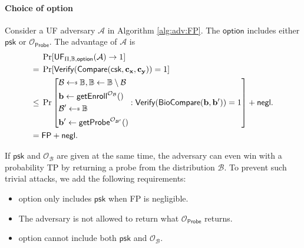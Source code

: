 \paragraph{Choice of \textsf{option}}
\noindent Consider a \textsf{UF} adversary $\mathcal{A}$ in Algorithm \ref{alg:adv:FP}. The $\textsf{option}$ includes either $\textsf{psk}$ or $\mathcal{O}_{\textsf{Probe}}$. The advantage of $\mathcal{A}$ is
\begin{align*}
	& \Pr[\textsf{UF}_{\Pi, \mathbb{B}, \textsf{option}}(\mathcal{A}) \to 1] \\ 
	=\; & \Pr [ \textsf{Verify}(\textsf{Compare}(\textsf{csk}, \mathbf{c_x}, \mathbf{c_y})) = 1 ] \\
	\leq\; & \Pr \left [
		\begin{aligned}
			& \mathcal{B} \getsdollar \mathbb{B}, \mathbb{B} \gets \mathbb{B} \setminus \mathcal{B} \\
			& \mathbf{b} \gets \textsf{getEnroll}^{\mathcal{O}_{\mathcal{B}} }() \\
			& \mathcal{B}^\prime \getsdollar \mathbb{B} \\
			& \mathbf{b}^\prime \gets \textsf{getProbe}^{\mathcal{O}_{\mathcal{B}^\prime} }()
		\end{aligned}
		: \textsf{Verify}(\textsf{BioCompare}(\mathbf{b}, \mathbf{b}^\prime)) = 1 \right ] + \negl. \\
	=\; & \textsf{FP} + \negl.
\end{align*}

\noindent If $\textsf{psk}$ and $\mathcal{O}_{\mathcal{B}}$ are given at the same time, the adversary can even win with a probability \textsf{TP} by returning a probe from the distribution $\mathcal{B}$. To prevent such trivial attacks, we add the following requirements:

\begin{itemize}
	\item \textsf{option} only includes $\textsf{psk}$ when \textsf{FP} is negligible.

	\item \label{item:requirement} The adversary is not allowed to return what $\mathcal{O}_\textsf{Probe}$ returns.
	
	\item \textsf{option} cannot include both $\textsf{psk}$ and $\mathcal{O}_{\mathcal{B}}$.
\end{itemize}

